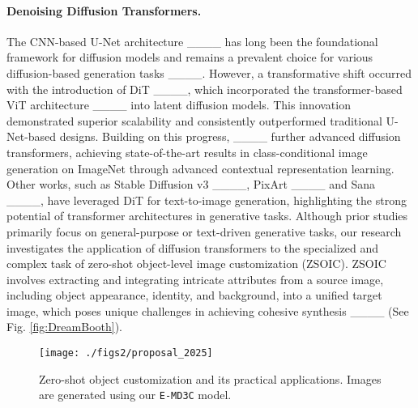 \paragraph{Denoising Diffusion Transformers.}
The CNN-based U-Net architecture ____ has long been the foundational framework for diffusion models and remains a prevalent choice for various diffusion-based generation tasks ____. However, a transformative shift occurred with the introduction of DiT ____, which incorporated the transformer-based ViT architecture ____ into latent diffusion models. This innovation demonstrated superior scalability and consistently outperformed traditional U-Net-based designs. Building on this progress, ____ further advanced diffusion transformers, achieving state-of-the-art results in class-conditional image generation on ImageNet through advanced contextual representation learning. Other works, such as Stable Diffusion v3 ____, PixArt ____ and Sana ____, have leveraged DiT for text-to-image generation, highlighting the strong potential of transformer architectures in generative tasks. Although prior studies primarily focus on general-purpose or text-driven generative tasks, our research investigates the application of diffusion transformers to the specialized and complex task of zero-shot object-level image customization (ZSOIC). ZSOIC involves extracting and integrating intricate attributes from a source image, including object appearance, identity, and background, into a unified target image, which poses unique challenges in achieving cohesive synthesis ____ (See Fig. \ref{fig:DreamBooth}).

\begin{figure*} %
  \centering
  \texttt{[image: ./figs2/proposal\_2025]}
  \vspace{-16pt}
  \caption{Zero-shot object customization and its practical applications. Images are generated using our \texttt{E-MD3C} model.}
  \label{fig:task}
  \vspace{-12pt}
\end{figure*}

